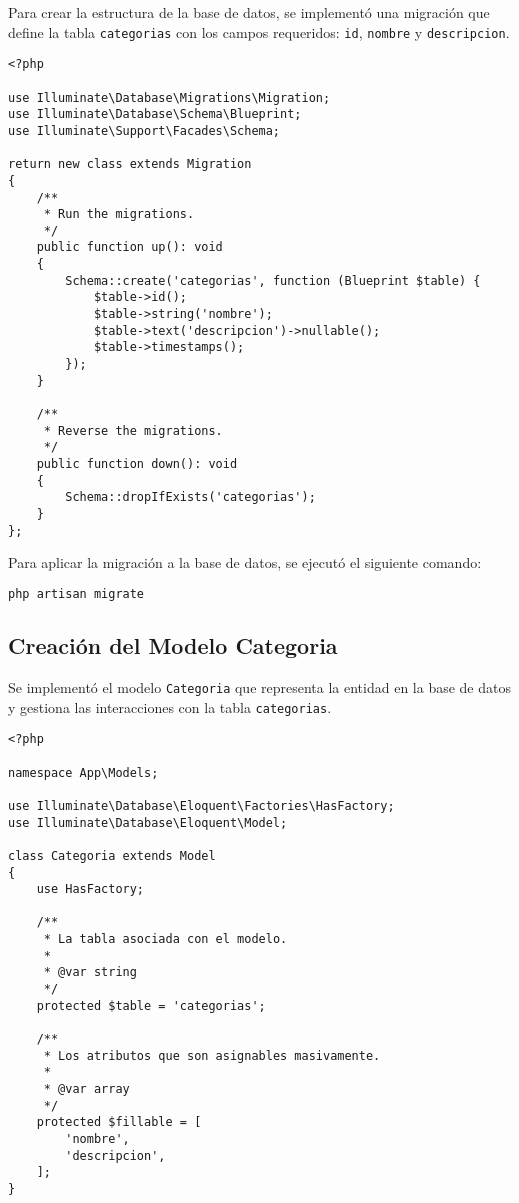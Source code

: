 \documentclass{article}
\begin{document}
Para crear la estructura de la base de datos, se implementó una migración que define la tabla \texttt{categorias} con los campos requeridos: \texttt{id}, \texttt{nombre} y \texttt{descripcion}.

\begin{lstlisting}[language=laravelPHP, caption=Migración para la tabla categorias]
<?php

use Illuminate\Database\Migrations\Migration;
use Illuminate\Database\Schema\Blueprint;
use Illuminate\Support\Facades\Schema;

return new class extends Migration
{
    /**
     * Run the migrations.
     */
    public function up(): void
    {
        Schema::create('categorias', function (Blueprint $table) {
            $table->id();
            $table->string('nombre');
            $table->text('descripcion')->nullable();
            $table->timestamps();
        });
    }

    /**
     * Reverse the migrations.
     */
    public function down(): void
    {
        Schema::dropIfExists('categorias');
    }
};
\end{lstlisting}

Para aplicar la migración a la base de datos, se ejecutó el siguiente comando:

\begin{lstlisting}[language=bash]
php artisan migrate
\end{lstlisting}

\subsection{Creación del Modelo Categoria}

Se implementó el modelo \texttt{Categoria} que representa la entidad en la base de datos y gestiona las interacciones con la tabla \texttt{categorias}.

\begin{lstlisting}[language=laravelPHP, caption=Modelo Categoria]
<?php

namespace App\Models;

use Illuminate\Database\Eloquent\Factories\HasFactory;
use Illuminate\Database\Eloquent\Model;

class Categoria extends Model
{
    use HasFactory;

    /**
     * La tabla asociada con el modelo.
     *
     * @var string
     */
    protected $table = 'categorias';

    /**
     * Los atributos que son asignables masivamente.
     *
     * @var array
     */
    protected $fillable = [
        'nombre',
        'descripcion',
    ];
}
\end{lstlisting}
\end{document}
